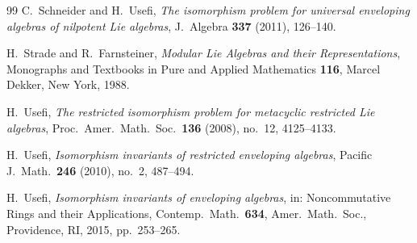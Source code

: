 \documentclass[11pt,reqno]{amsart}
\theoremstyle{plain}
\theoremstyle{remark}
\begin{document}
\begin{thebibliography}{99}
C.~Schneider and H.~Usefi, \emph{The isomorphism problem for universal
enveloping algebras of nilpotent Lie algebras}, J.~Algebra \textbf{337}
(2011), 126--140.

H.~Strade and R.~Farnsteiner, \emph{Modular Lie Algebras and their
Representations}, Monographs and Textbooks in Pure and Applied Mathematics
\textbf{116}, Marcel Dekker, New York, 1988.

H.~Usefi, \emph{The restricted isomorphism problem for metacyclic restricted
Lie algebras}, Proc.\ Amer.\ Math.\ Soc.\ \textbf{136} (2008), no.~12,
4125--4133.

H.~Usefi, \emph{Isomorphism invariants of restricted enveloping algebras},
Pacific J.~Math.\ \textbf{246} (2010), no.~2, 487--494.

H.~Usefi, \emph{Isomorphism invariants of enveloping algebras}, in:
Noncommutative Rings and their Applications, Contemp.\ Math.\ \textbf{634},
Amer.\ Math.\ Soc., Providence, RI, 2015, pp.~253--265.

\end{thebibliography}
\end{document}
